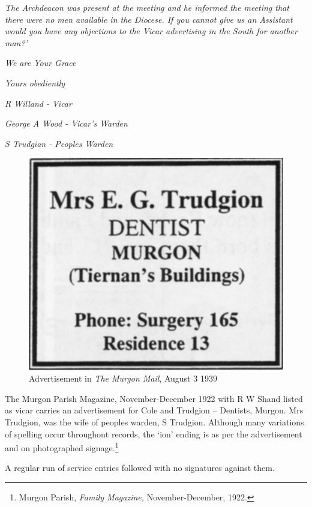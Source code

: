\emph{The Archdeacon was present at the meeting and he informed the meeting that there were no men available in the Diocese. If you cannot give us an Assistant would you have any objections to the Vicar advertising in the South for another man?'}



\emph{We are Your Grace}



\emph{Yours obediently}



\emph{R Willand - Vicar}



\emph{George A Wood - Vicar's Warden}



\emph{S Trudgian - Peoples Warden}



\medskip








\begin{figure}
\begin{center}
\includegraphics[width=.5\linewidth,center]{../images/trudgionAd.jpg}
\caption{Advertisement in \emph{The Murgon Mail}, August 3 1939}
\end{center}
\end{figure}




The Murgon Parish Magazine, November-December 1922 with R W Shand listed as vicar carries an advertisement for Cole and Trudgion -- Dentists, Murgon. Mrs Trudgion, was the wife of peoples warden, S Trudgion. Although many variations of spelling occur throughout records, the `ion' ending is as per the advertisement and on photographed signage.\footnote{Murgon Parish, \emph{Family Magazine,} November-December, 1922.}


A regular run of service entries followed with no signatures against them.



